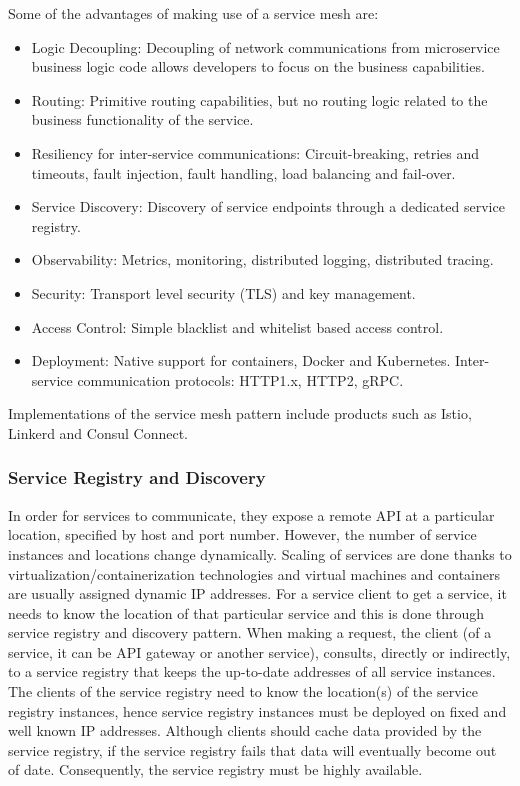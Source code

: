 \documentclass{Configuration_Files/PoliMi3i_thesis}
\begin{document}
Some of the advantages of making use of a service mesh are:

\begin{itemize}
    \item Logic Decoupling: Decoupling of network communications from microservice business logic code allows developers to focus on the business capabilities.
    
    \item Routing: Primitive routing capabilities, but no routing logic related to the business functionality of the service.
    
    \item Resiliency for inter-service communications: Circuit-breaking, retries and timeouts, fault injection, fault handling, load balancing and fail-over. 
    
    \item Service Discovery: Discovery of service endpoints through a dedicated service registry.
    
    \item Observability: Metrics, monitoring, distributed logging, distributed tracing.
    
    \item Security: Transport level security (TLS) and key management.
    
    \item Access Control: Simple blacklist and whitelist based access control.
    
    \item Deployment: Native support for containers, Docker and Kubernetes. Inter-service communication protocols: HTTP1.x, HTTP2, gRPC.
\end{itemize}

Implementations of the service mesh pattern include products such as Istio, Linkerd and Consul Connect.

\subsubsection{Service Registry and Discovery}
\label{subsubsec:srd}

In order for services to communicate, they expose a remote API at a particular location, specified by host and port number.
However, the number of service instances and locations change dynamically.
Scaling of services are done thanks to virtualization/containerization technologies and virtual machines and containers are usually assigned dynamic IP addresses.
For a service client to get a service, it needs to know the location of that particular service and this is done through service registry and discovery pattern.
When making a request, the client (of a service, it can be API gateway or another service), consults, directly or indirectly, to a service registry that keeps the up-to-date addresses of all service instances.
The clients of the service registry need to know the location(s) of the service registry instances, hence service registry instances must be deployed on fixed and well known IP addresses.
Although clients should cache data provided by the service registry, if the service registry fails that data will eventually become out of date. 
Consequently, the service registry must be highly available.
\end{document}
